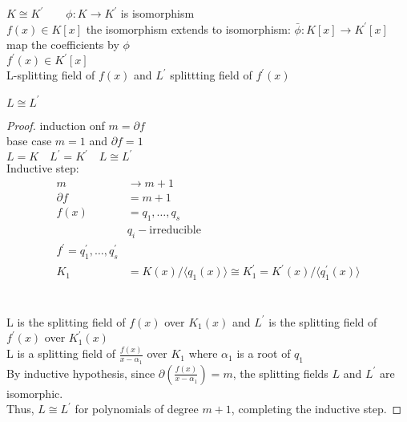 \documentclass{article}
\begin{document}
\section{}
$K \cong K^\prime \quad \quad \phi: K \to K^\prime$ is isomorphism \\
$f(x) \in K[x]$ the isomorphism extends to isomorphism: $\bar{\phi}: K[x] \to K^\prime[x]$ \\ map the coefficients by $\phi$ \\ 
$f^\prime(x) \in K^\prime[x]$ \\
L-splitting field of $f(x)$ and $L^\prime$ splittting field of $f^\prime(x)$ \\ 
\begin{theorem}$L \cong L^\prime$  \leavevmode \\ 
    \begin{proof}
        induction onf $m = \partial f$ \\
        base case $m = 1$  and $\partial f= 1$ \\
        $L=K \quad L^\prime = K^\prime \quad L \cong  L^\prime$ \\
        Inductive step: 
        \\ 
        \begin{align}
            m &\rightarrow m + 1 \\ 
            \partial f & = m + 1 \\ 
            f(x) & = q_1, \dots , q_s \\ 
            &q_i-\text{irreducible} \\ 
            f^\prime = q_1^\prime, \dots , q_s^\prime \\
            K_1 &= K(x) / \langle q_1(x) \rangle \cong K_1^\prime = K^\prime(x) / \langle q_1^\prime(x) \rangle \\
        \end{align}
          \\ 
        L is the splitting field of $f(x)$ over $K_1(x)$ and $L^\prime$ is the splitting field of $f^\prime(x)$ over $K_1^\prime(x)$ \\
        L is a splitting field of $\frac{f(x)}{x - \alpha_1}$ over $K_1$ where $\alpha_1$ is a root of $q_1$ \\
        By inductive hypothesis, since $\partial(\frac{f(x)}{x - \alpha_1}) = m$, the splitting fields $L$ and $L^\prime$ are isomorphic. \\ 
        Thus, $L \cong L^\prime$ for polynomials of degree $m+1$, completing the inductive step.
     \end{proof}
    
\end{theorem}
\end{document}
